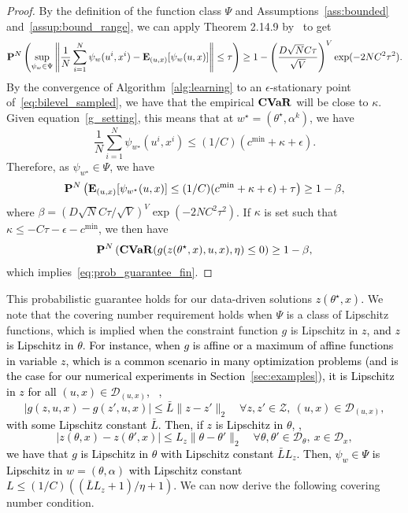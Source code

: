 \documentclass[11pt]{article}
\newtheorem{corollary}{Corollary}[theorem]
\newcommand{\bsnote}[1]{\noindent\textcolor{red}{\texttt{Bartolomeo: #1}}}
\newcommand{\RC}[1]{\textcolor{black}{#1}}
\begin{document}
\begin{proof}
By the definition of the function class $\Psi$ and Assumptions~\ref{ass:bounded} and~\ref{assup:bound_range}, we can apply Theorem 2.14.9 by~\cite{empirical} to get
$${\mathbf P}^{N}\left (\sup_{\psi_{w} \in \Psi} \left \|\frac{1}{N}\sum_{i=1}^N \psi_{w}(u^i, x^i) - \mathbf{E}_{(u,x)}[\psi_{w}(u,x)] \right \| \leq \tau\right ) \geq 1 - \left (\frac{D\sqrt{N}C\tau}{\sqrt{V}}\right )^V\exp(-2NC^2\tau^2).$$
By the convergence of Algorithm~\ref{alg:learning} to an $\epsilon$-stationary point of~\eqref{eq:bilevel_sampled},
we have that the empirical $\mathop{\bf CVaR}$ will be close to $\kappa$. Given equation~\eqref{g_setting}, this means that at $w^\star = (\theta^\star, \alpha^k)$, we have
$$\frac{1}{N}\sum_{i=1}^N \psi_{{w}^{\star}}(u^i, x^i) \leq (1/C)(c^{\min} + \kappa+ \epsilon).$$
Therefore, as $\psi_{{w}^{\star}} \in \Psi$, we have
$${\mathbf P}^{N}\left ( \mathbf{E}_{(u,x)}[\psi_{w^\star}(u,x)] \leq (1/C)(c^{\min}+ \kappa+\epsilon) + \tau\right ) \geq 1 - \beta,$$
where $\beta =(D\sqrt{N}C\tau/\sqrt{V})^V\exp(-2NC^2\tau^2)$.
If $\kappa$ is set such that $\kappa \leq -C\tau - \epsilon - c^{\min}$, we then have
$${\mathbf P}^{N}\left (\mathop{\bf CVaR}(g(z(\theta^\star,x),u,x),\eta)\leq 0 \right ) \geq 1 - \beta,$$
which implies~\eqref{eq:prob_guarantee_fin}.
\end{proof}
This probabilistic guarantee holds for our data-driven solutions \RC{$z(\theta^\star,x)$.} 
We note that the covering number requirement holds when $\Psi$ is a class of Lipschitz functions, which is implied when the constraint function $g$ is Lipschitz in \RC{$z$, and $z$ is Lipschitz in $\theta$. 
For instance, when $g$ is affine or a maximum of affine functions in variable $z$, which is a common scenario in many optimization problems (and is the case for our numerical experiments in Section~\ref{sec:examples}), it is Lipschitz in $z$ for all $(u,x) \in \mathcal{D}_{(u,x)}$,
~\ie,$$|g(z,u,x) - g(z',u,x) |\leq \bar{L}\|z - z'\|_2 \quad \forall z,z'\in \mathcal{Z},~(u,x) \in \mathcal{D}_{(u,x)},$$
with some Lipschitz constant $\bar{L}$. 
Then, if $z$ is Lipschitz in $\theta$, \ie,
$$|z(\theta,x) - z(\theta',x) |\leq L_z\|\theta - \theta'\|_2 \quad \forall \theta,\theta'\in \mathcal{D}_\theta,~x\in \mathcal{D}_x,$$
we have that $g$ is Lipschitz in $\theta$ with Lipschitz constant $\bar{L}L_z$.
Then, $\psi_w \in \Psi$ is Lipschitz in $w=(\theta,\alpha)$ with Lipschitz constant $L \leq (1/C)((\bar{L}L_z+1)/\eta + 1)$. }
We can now derive the following covering number condition.
\end{document}
